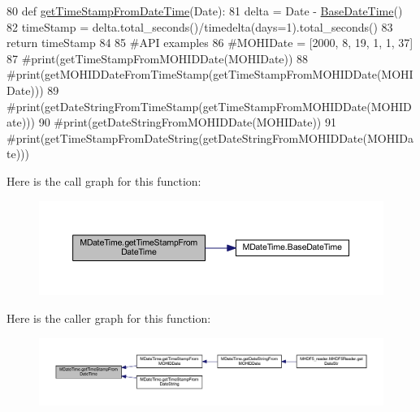 \begin{DoxyCode}
80 \textcolor{keyword}{def }\mbox{\hyperlink{namespace_m_date_time_a577bd538a3fcb0bbddf8900288324eb5}{getTimeStampFromDateTime}}(Date):
81     delta = Date - \mbox{\hyperlink{namespace_m_date_time_a3e8d38d306730c6707a17503e2d21d6c}{BaseDateTime}}()
82     timeStamp = delta.total\_seconds()/timedelta(days=1).total\_seconds()
83     \textcolor{keywordflow}{return} timeStamp
84 
85 \textcolor{comment}{#API examples}
86 \textcolor{comment}{#MOHIDate = [2000, 8, 19, 1, 1, 37]}
87 \textcolor{comment}{#print(getTimeStampFromMOHIDDate(MOHIDate))}
88 \textcolor{comment}{#print(getMOHIDDateFromTimeStamp(getTimeStampFromMOHIDDate(MOHIDate)))}
89 \textcolor{comment}{#print(getDateStringFromTimeStamp(getTimeStampFromMOHIDDate(MOHIDate)))}
90 \textcolor{comment}{#print(getDateStringFromMOHIDDate(MOHIDate))}
91 \textcolor{comment}{#print(getTimeStampFromDateString(getDateStringFromMOHIDDate(MOHIDate)))}
\end{DoxyCode}
Here is the call graph for this function\+:\nopagebreak
\begin{figure}[H]
\begin{center}
\leavevmode
\includegraphics[width=350pt]{namespace_m_date_time_a577bd538a3fcb0bbddf8900288324eb5_cgraph}
\end{center}
\end{figure}
Here is the caller graph for this function\+:\nopagebreak
\begin{figure}[H]
\begin{center}
\leavevmode
\includegraphics[width=350pt]{namespace_m_date_time_a577bd538a3fcb0bbddf8900288324eb5_icgraph}
\end{center}
\end{figure}
\mbox{\label{namespace_m_date_time_a038322da9ec8ee2770a307c6a63187dd}} 
